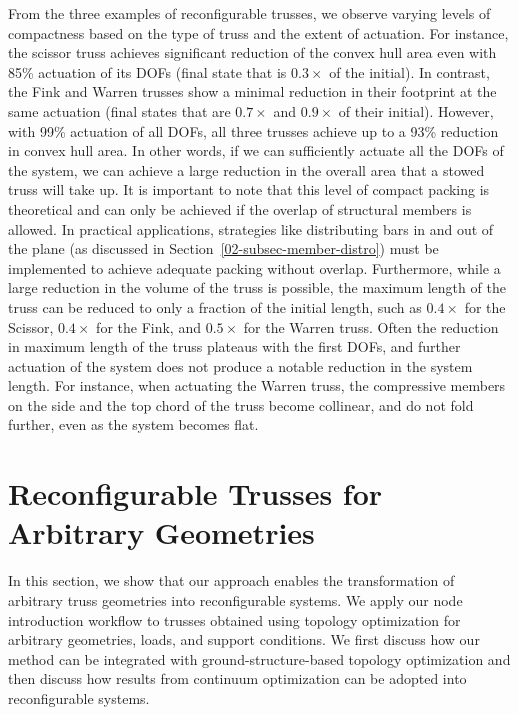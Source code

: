 From the three examples of reconfigurable trusses, we observe varying levels of compactness based on the type of truss and the extent of actuation. For instance, the scissor truss achieves significant reduction of the convex hull area even with 85\% actuation of its DOFs (final state that is \(0.3\times{}\) of the initial). In contrast, the Fink and Warren trusses show a minimal reduction in their footprint at the same actuation (final states that are \(0.7\times{}\) and \(0.9\times{}\) of their initial). However, with 99\% actuation of all DOFs, all three trusses achieve up to a 93\% reduction in convex hull area. In other words, if we can sufficiently actuate all the DOFs of the system, we can achieve a large reduction in the overall area that a stowed truss will take up. It is important to note that this level of compact packing is theoretical and can only be achieved if the overlap of structural members is allowed. In practical applications, strategies like distributing bars in and out of the plane (as discussed in Section~\ref{02-subsec-member-distro}) must be implemented to achieve adequate packing without overlap. Furthermore, while a large reduction in the volume of the truss is possible, the maximum length of the truss can be reduced to only a fraction of the initial length, such as \(0.4\times{}\) for the Scissor, \(0.4\times{}\) for the Fink, and \(0.5\times{}\) for the Warren truss. Often the reduction in maximum length of the truss plateaus with the first DOFs, and further actuation of the system does not produce a notable reduction in the system length. For instance, when actuating the Warren truss, the compressive members on the side and the top chord of the truss become collinear, and do not fold further, even as the system becomes flat. 

\section{Reconfigurable Trusses for Arbitrary Geometries}\label{02-sec-arbit-trusses}
In this section, we show that our approach enables the transformation of arbitrary truss geometries into reconfigurable systems. We apply our node introduction workflow to trusses obtained using topology optimization for arbitrary geometries, loads, and support conditions. We first discuss how our method can be integrated with ground-structure-based topology optimization and then discuss how results from continuum optimization can be adopted into reconfigurable systems. 

